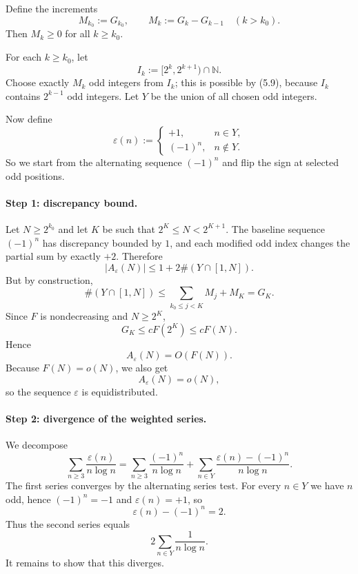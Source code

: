 Define the increments
\[
M_{k_0}:=G_{k_0},
\qquad
M_k:=G_k-G_{k-1} \quad (k>k_0).
\]
Then $M_k\ge 0$ for all $k\ge k_0$.

For each $k\ge k_0$, let
\[
I_k:=[2^k,2^{k+1})\cap \mathbb{N}.
\]
Choose exactly $M_k$ odd integers from $I_k$; this is possible by (5.9), because $I_k$ contains $2^{k-1}$ odd integers.  Let $Y$ be the union of all chosen odd integers.

Now define
\[
\varepsilon(n):=
\begin{cases}
+1, & n\in Y,\\
(-1)^n, & n\notin Y.
\end{cases}
\tag{5.10}
\]
So we start from the alternating sequence $(-1)^n$ and flip the sign at selected odd positions.

\paragraph{Step 1: discrepancy bound.}
Let $N\ge 2^{k_0}$ and let $K$ be such that $2^K\le N<2^{K+1}$.  The baseline sequence $(-1)^n$ has discrepancy bounded by $1$, and each modified odd index changes the partial sum by exactly $+2$.  Therefore
\[
|A_\varepsilon(N)|
\le 1 + 2\#(Y\cap[1,N]).
\tag{5.11}
\]
But by construction,
\[
\#(Y\cap[1,N])\le \sum_{k_0\le j<K}M_j + M_K = G_K.
\tag{5.12}
\]
Since $F$ is nondecreasing and $N\ge 2^K$,
\[
G_K\le cF(2^K)\le cF(N).
\tag{5.13}
\]
Hence
\[
A_\varepsilon(N)=O(F(N)).
\tag{5.14}
\]
Because $F(N)=o(N)$, we also get
\[
A_\varepsilon(N)=o(N),
\tag{5.15}
\]
so the sequence $\varepsilon$ is equidistributed.

\paragraph{Step 2: divergence of the weighted series.}
We decompose
\[
\sum_{n\ge 3}\frac{\varepsilon(n)}{n\log n}
=
\sum_{n\ge 3}\frac{(-1)^n}{n\log n}
+
\sum_{n\in Y}\frac{\varepsilon(n)-(-1)^n}{n\log n}.
\tag{5.16}
\]
The first series converges by the alternating series test.  For every $n\in Y$ we have $n$ odd, hence $(-1)^n=-1$ and $\varepsilon(n)=+1$, so
\[
\varepsilon(n)-(-1)^n = 2.
\tag{5.17}
\]
Thus the second series equals
\[
2\sum_{n\in Y}\frac{1}{n\log n}.
\tag{5.18}
\]
It remains to show that this diverges.

